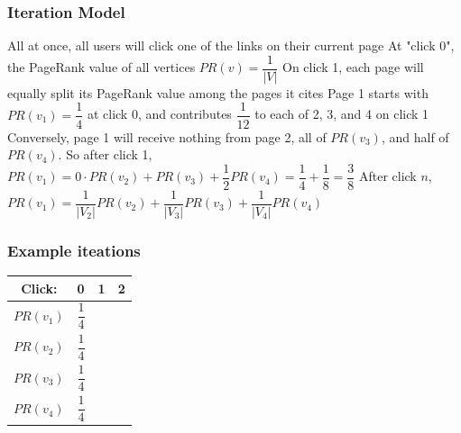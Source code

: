 \documentclass{beamer}
\begin{document}
\begin{frame}[t]
\frametitle{Iteration Model}
\begin{outline}
    \1 All at once, all users will click one of the links on their current page
    \1 At "click 0", the PageRank value of all vertices $PR(v) = \dfrac{1}{|V|}$
    \1 On click 1, each page will equally split its PageRank value among the pages it cites
    \1 Page 1 starts with $PR(v_1) = \dfrac{1}{4}$ at click 0, and contributes $\dfrac{1}{12}$ to each of 2, 3, and 4 on click 1
    \1 Conversely, page 1 will receive nothing from page 2, all of $PR(v_3)$, and half of $PR(v_4)$. So after click 1, $PR(v_1) = 0\cdot PR(v_2) + PR(v_3) + \dfrac{1}{2}PR(v_4) = \dfrac{1}{4} + \dfrac{1}{8} = \dfrac{3}{8}$
    \1 After click $n$, $PR(v_1) = \dfrac{1}{|V_2|}PR(v_2) + \dfrac{1}{|V_3|}PR(v_3) + \dfrac{1}{|V_4|}PR(v_4)$
\end{outline}
\end{frame}

\begin{frame}
\frametitle{Example iteations}
\bgroup
\def\arraystretch{3}
\begin{tabular}{|c|l|l|l|}
    \hline
    Click: & 0 & 1 & 2\\
    \hline
    $PR(v_1)$ & $\dfrac{1}{4}$ & & \\
    $PR(v_2)$ & $\dfrac{1}{4}$ & & \\
    $PR(v_3)$ & $\dfrac{1}{4}$ & & \\
    $PR(v_4)$ & $\dfrac{1}{4}$ & & \\
    \hline
\end{tabular}
\egroup
\end{frame}
\end{document}
